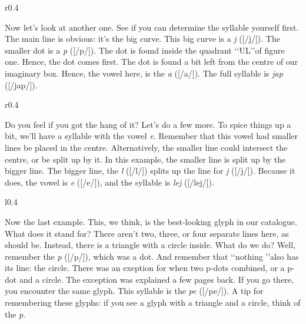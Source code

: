 \begin{wrapfigure}[7]{r}{0.4\textwidth}
\renewcommand{\corpsgrootte}{100pt}
	\vspace{-1cm}
\jap
\restorecorps
\end{wrapfigure}

\vspace{0.2cm}
Now let's look at another one. See if you can determine the syllable yourself first. The main line is obvious: it's the big curve. This big curve is a {\it j\footnotemark} ([/j/]). The smaller dot is a {\it p} ([/p/]). The dot is found inside the quadrant \lq\lq UL\rq\rq of figure one. Hence, the dot comes first. The dot is found a bit left from the centre of our imaginary box. Hence, the vowel here, is the {\it a} ([/a/]). The full syllable is {\it jap} ([/jap/]). 


\begin{wrapfigure}[7]{r}{0.4\textwidth}
\renewcommand{\corpsgrootte}{100pt}
\vspace{-0.5cm}
\lej
\restorecorps
\end{wrapfigure}


Do you feel if you got the hang of it? Let's do a few more. To spice things up a bit, we'll have a syllable with the vowel {\it e}. Remember that this vowel had smaller lines be placed in the centre. Alternatively, the smaller line could intersect the centre, or be split up by it. In this example, the smaller line is split up by the bigger line. The bigger line, the {\it l} ([/l/]) splits up the line for {\it j} ([/j/]). Because it does, the vowel is {\it e} ([/e/]), and the syllable is {\it lej} ([/lej/]). 


\begin{wrapfigure}[7]{l}{0.4\textwidth}
\renewcommand{\corpsgrootte}{100pt}
\vspace{-0.5cm}
\pe
\restorecorps
\end{wrapfigure}

Now the last example. This, we think, is the best-looking glyph in our catalogue. What does it stand for? There aren't two, three, or four separate lines here, as should be. Instead, there is a triangle with a circle inside. What do we do? Well, remember the {\it p} ([/p/]), which was a dot. And remember that \lq\lq nothing \rq\rq also has its line: the circle. There was an exeption for when two p-dots combined, or a p-dot and a circle. The exception was explained a few pages back. If you go there, you encounter the same glyph. This syllable is the {\it pe} ([/pe/]). A tip for remembering these glyphs: if you see a glyph with a triangle and a circle, think of the {\it p}.

